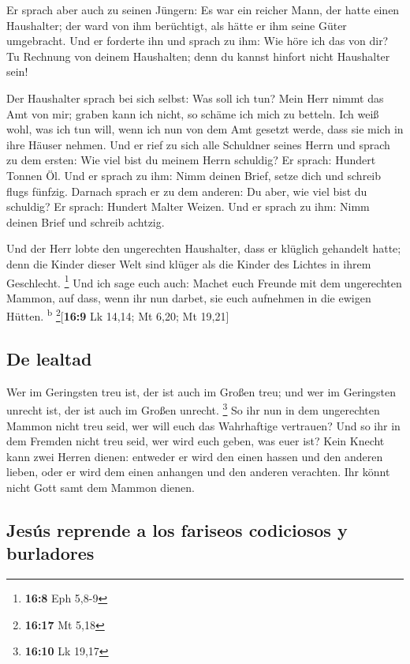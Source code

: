  Er sprach aber auch zu seinen Jüngern: Es war ein reicher
Mann, der hatte einen Haushalter; der ward von ihm berüchtigt, als hätte
er ihm seine Güter umgebracht.  Und er forderte ihn und
sprach zu ihm: Wie höre ich das von dir? Tu Rechnung von deinem
Haushalten; denn du kannst hinfort nicht Haushalter sein!

 Der Haushalter sprach bei sich selbst: Was soll ich tun?
Mein Herr nimmt das Amt von mir; graben kann ich nicht, so schäme ich
mich zu betteln.  Ich weiß wohl, was ich tun will, wenn
ich nun von dem Amt gesetzt werde, dass sie mich in ihre Häuser nehmen.
 Und er rief zu sich alle Schuldner seines Herrn und
sprach zu dem ersten: Wie viel bist du meinem Herrn schuldig?
 Er sprach: Hundert Tonnen Öl. Und er sprach zu ihm: Nimm
deinen Brief, setze dich und schreib flugs fünfzig. 
Darnach sprach er zu dem anderen: Du aber, wie viel bist du schuldig? Er
sprach: Hundert Malter Weizen. Und er sprach zu ihm: Nimm deinen Brief
und schreib achtzig.

 Und der Herr lobte den ungerechten Haushalter, dass er
klüglich gehandelt hatte; denn die Kinder dieser Welt sind klüger als
die Kinder des Lichtes in ihrem Geschlecht. \footnote{\textbf{16:8} Eph
  5,8-9}  Und ich sage euch auch: Machet euch Freunde mit
dem ungerechten Mammon, auf dass, wenn ihr nun darbet, sie euch
aufnehmen in die ewigen Hütten. \textsuperscript{b}
\footnote{\textbf{16:17} Mt 5,18}{[}\textbf{16:9} Lk 14,14; Mt 6,20; Mt
19,21{]}

\hypertarget{de-lealtad}{%
\subsection{De lealtad}\label{de-lealtad}}

 Wer im Geringsten treu ist, der ist auch im Großen treu;
und wer im Geringsten unrecht ist, der ist auch im Großen unrecht.
\footnote{\textbf{16:10} Lk 19,17}  So ihr nun in dem
ungerechten Mammon nicht treu seid, wer will euch das Wahrhaftige
vertrauen?  Und so ihr in dem Fremden nicht treu seid,
wer wird euch geben, was euer ist?  Kein Knecht kann zwei
Herren dienen: entweder er wird den einen hassen und den anderen lieben,
oder er wird dem einen anhangen und den anderen verachten. Ihr könnt
nicht Gott samt dem Mammon dienen.

\hypertarget{jesuxfas-reprende-a-los-fariseos-codiciosos-y-burladores}{%
\subsection{Jesús reprende a los fariseos codiciosos y
burladores}\label{jesuxfas-reprende-a-los-fariseos-codiciosos-y-burladores}}

